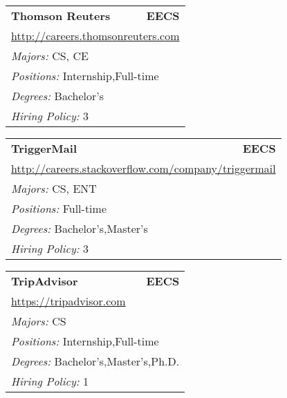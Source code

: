\documentclass[twoside]{article}
\begin{document}
\begin{center}
\begin{multicols}{3}
\begin{FlushLeft}
\begin{minipage}{.9\columnwidth}
\end{minipage}
 
\begin{minipage}{.9\columnwidth}\begin{tabularx}{.95\columnwidth}{Xr}
                 {\Large\bf Thomson Reuters} & {\Large\bf EECS}\\
    \multicolumn{2}{p{.95\columnwidth}}{\url{http://careers.thomsonreuters.com}}\\
    \multicolumn{2}{p{.95\columnwidth}}{\emph{Majors:} CS, CE}\\
    \multicolumn{2}{p{.95\columnwidth}}{\emph{Positions:} Internship,Full-time}\\
    \multicolumn{2}{p{.95\columnwidth}}{\emph{Degrees:} Bachelor's}\\
    \multicolumn{2}{p{.95\columnwidth}}{\emph{Hiring Policy:} 3}\\
    \end{tabularx}
    
\end{minipage}
 
\begin{minipage}{.9\columnwidth}\begin{tabularx}{.95\columnwidth}{Xr}
                 {\Large\bf TriggerMail} & {\Large\bf EECS}\\
    \multicolumn{2}{p{.95\columnwidth}}{\url{http://careers.stackoverflow.com/company/triggermail}}\\
    \multicolumn{2}{p{.95\columnwidth}}{\emph{Majors:} CS, ENT}\\
    \multicolumn{2}{p{.95\columnwidth}}{\emph{Positions:} Full-time}\\
    \multicolumn{2}{p{.95\columnwidth}}{\emph{Degrees:} Bachelor's,Master's}\\
    \multicolumn{2}{p{.95\columnwidth}}{\emph{Hiring Policy:} 3}\\
    \end{tabularx}
    
\end{minipage}
 
\begin{minipage}{.9\columnwidth}\begin{tabularx}{.95\columnwidth}{Xr}
                 {\Large\bf TripAdvisor} & {\Large\bf EECS}\\
    \multicolumn{2}{p{.95\columnwidth}}{\url{https://tripadvisor.com}}\\
    \multicolumn{2}{p{.95\columnwidth}}{\emph{Majors:} CS}\\
    \multicolumn{2}{p{.95\columnwidth}}{\emph{Positions:} Internship,Full-time}\\
    \multicolumn{2}{p{.95\columnwidth}}{\emph{Degrees:} Bachelor's,Master's,Ph.D.}\\
    \multicolumn{2}{p{.95\columnwidth}}{\emph{Hiring Policy:} 1}\\
    \end{tabularx}
    

\end{minipage}
\end{FlushLeft}
\end{multicols}
\end{center}
\end{document}
